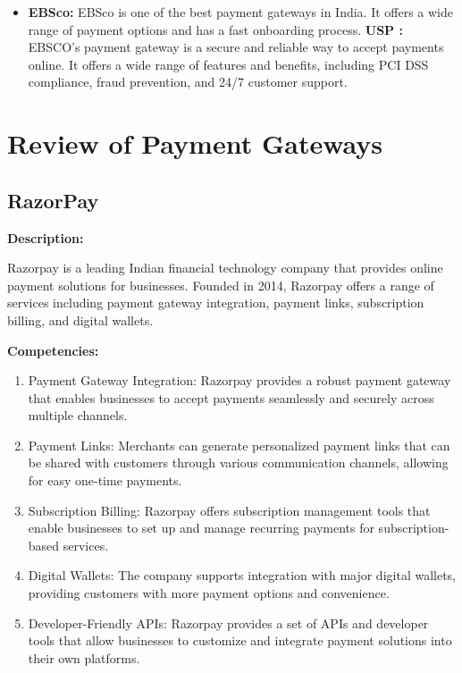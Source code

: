 \begin{enumerate}
\begin{itemize}
    \item \textbf{EBSco:} EBSco is one of the best payment gateways in India. It offers a wide range of payment options and has a fast onboarding process.
    \textbf{USP : }EBSCO's payment gateway is a secure and reliable way to accept payments online. It offers a wide range of features and benefits, including PCI DSS compliance, fraud prevention, and 24/7 customer support.


\end{itemize}
\end{enumerate}

\section{Review of Payment Gateways}
\subsection{RazorPay}
\textbf{Description:}

Razorpay is a leading Indian financial technology company that provides online payment solutions for businesses. Founded in 2014, Razorpay offers a range of services including payment gateway integration, payment links, subscription billing, and digital wallets. 

\textbf{Competencies:}

\begin{enumerate}
  \item Payment Gateway Integration: Razorpay provides a robust payment gateway that enables businesses to accept payments seamlessly and securely across multiple channels.
  \item Payment Links: Merchants can generate personalized payment links that can be shared with customers through various communication channels, allowing for easy one-time payments.
  \item Subscription Billing: Razorpay offers subscription management tools that enable businesses to set up and manage recurring payments for subscription-based services.
  \item Digital Wallets: The company supports integration with major digital wallets, providing customers with more payment options and convenience.
  \item Developer-Friendly APIs: Razorpay provides a set of APIs and developer tools that allow businesses to customize and integrate payment solutions into their own platforms.
\end{enumerate}

